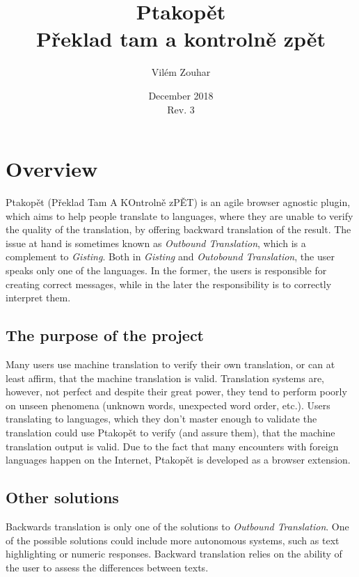 \documentclass[a4paper]{article}
\begin{document}
\title{Ptakopět \\ \large Překlad tam a kontrolně zpět }
\author{Vilém Zouhar}
\date{December 2018 \\ Rev. 3}
\maketitle 


\section{Overview}
Ptakopět (Překlad Tam A KOntrolně zPĚT) is an agile browser agnostic plugin, which aims to help people translate to languages, where they are unable to verify the quality of the translation, by offering backward translation of the result. The issue at hand is sometimes known as \textit{Outbound Translation}, which is a complement to \textit{Gisting}. Both in \textit{Gisting} and \textit{Outobound Translation}, the user speaks only one of the languages. In the former, the users is responsible for creating correct messages, while in the later the responsibility is to correctly interpret them. 

\subsection{The purpose of the project}
Many users use machine translation to verify their own translation, or can at least affirm, that the machine translation is valid. Translation systems are, however, not perfect and despite their great power, they tend to perform poorly on unseen phenomena (unknown words, unexpected word order, etc.). Users translating to languages, which they don't master enough to validate the translation could use Ptakopět to verify (and assure them), that the machine translation output is valid. Due to the fact that many encounters with foreign languages happen on the Internet, Ptakopět is developed as a browser extension.

\subsection{Other solutions}
Backwards translation is only one of the solutions to \textit{Outbound Translation}. One of the possible solutions could include more autonomous systems, such as text highlighting or numeric responses. Backward translation relies on the ability of the user to assess the differences between texts.
\end{document}
